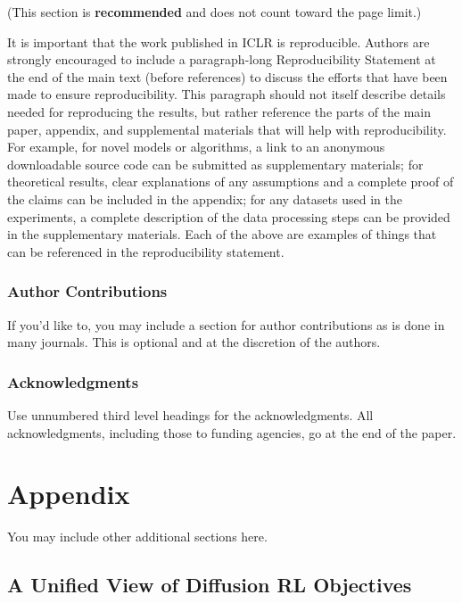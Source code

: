 \documentclass{article} %
\begin{document}
(This section is \textbf{recommended} and does not count toward the page limit.)

It is important that the work published in ICLR is reproducible. Authors are
strongly encouraged to include a paragraph-long Reproducibility Statement at the
end of the main text (before references) to discuss the efforts that have been
made to ensure reproducibility. This paragraph should not itself describe
details needed for reproducing the results, but rather reference the parts of
the main paper, appendix, and supplemental materials that will help with
reproducibility. For example, for novel models or algorithms, a link to an
anonymous downloadable source code can be submitted as supplementary materials;
for theoretical results, clear explanations of any assumptions and a complete
proof of the claims can be included in the appendix; for any datasets used in
the experiments, a complete description of the data processing steps can be
provided in the supplementary materials. Each of the above are examples of
things that can be referenced in the reproducibility statement.

\subsubsection*{Author Contributions}
If you'd like to, you may include  a section for author contributions as is done
in many journals. This is optional and at the discretion of the authors.

\subsubsection*{Acknowledgments}
Use unnumbered third level headings for the acknowledgments. All
acknowledgments, including those to funding agencies, go at the end of the paper.





\appendix
\section{Appendix}
You may include other additional sections here.


\subsection{A Unified View of Diffusion RL Objectives}
\label{sec:velocity_target_objectives}
\end{document}
